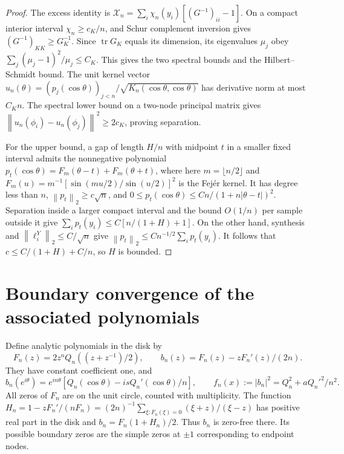 \documentclass[a4paper,11pt]{amsart}
\theoremstyle{remark}\newtheorem{remark}[theorem]{Remark}
\newcommand{\tr}{\operatorname{tr}}
\newcommand{\norm}[1]{\left\lVert#1\right\rVert}
\begin{document}
\begin{proof}
The excess identity is
$\mathscr X_n=\sum_i\chi_n(y_i)[(G^{-1})_{ii}-1]$.
On a compact interior interval $\chi_n\ge c_K/n$, and Schur
complement inversion gives $(G^{-1})_{KK}\ge G_K^{-1}$.
Since $\tr G_K$ equals its dimension, its eigenvalues $\mu_j$ obey
$\sum_j(\mu_j-1)^2/\mu_j\le C_K$.
This gives the two spectral bounds and the Hilbert--Schmidt bound.
The unit kernel vector
$u_n(\theta)=(p_j(\cos\theta))_{j<n}/\sqrt{K_n(\cos\theta,\cos\theta)}$
has derivative norm at most $C_Kn$. The spectral lower bound on a
two-node principal matrix gives
$\norm{u_n(\phi_i)-u_n(\phi_j)}^2\ge2c_K$, proving separation.

For the upper bound, a gap of length $H/n$ with midpoint $t$ in a
smaller fixed interval admits the nonnegative polynomial
$p_t(\cos\theta)=F_m(\theta-t)+F_m(\theta+t)$, where here
$m=\lfloor n/2\rfloor$ and
$F_m(u)=m^{-1}[\sin(mu/2)/\sin(u/2)]^2$ is the Fej\'er kernel.
It has degree less than $n$, $\norm{p_t}_2\ge c\sqrt n$, and
$0\le p_t(\cos\theta)\le Cn/(1+n|\theta-t|)^2$.
Separation inside a larger compact interval and the bound $O(1/n)$
per sample outside it give
$\sum_i p_t(y_i)\le C[n/(1+H)+1]$.
On the other hand, synthesis and
$\norm{\ell_i^Y}_2\le C/\sqrt n$ give
$\norm{p_t}_2\le Cn^{-1/2}\sum_i p_t(y_i)$.
It follows that $c\le C/(1+H)+C/n$, so $H$ is bounded.
\end{proof}

\section{Boundary convergence of the associated polynomials}

Define analytic polynomials in the disk by
\begin{equation}\label{polynomials}
 F_n(z)=2z^nQ_n((z+z^{-1})/2),\qquad
 b_n(z)=F_n(z)-zF_n'(z)/(2n).
\end{equation}
They have constant coefficient one, and
\begin{equation}\label{boundary-pair}
 b_n(e^{i\theta})=e^{in\theta}
 [Q_n(\cos\theta)-isQ_n'(\cos\theta)/n],\qquad
 f_n(x):=|b_n|^2=Q_n^2+aQ_n'^2/n^2.
\end{equation}
All zeros of $F_n$ are on the unit circle, counted with multiplicity.
The function
$H_n=1-zF_n'/(nF_n)
 =(2n)^{-1}\sum_{\xi:F_n(\xi)=0}(\xi+z)/(\xi-z)$
has positive real part in the disk and $b_n=F_n(1+H_n)/2$.
Thus $b_n$ is zero-free there. Its possible boundary zeros are the
simple zeros at $\pm1$ corresponding to endpoint nodes.
\end{document}
